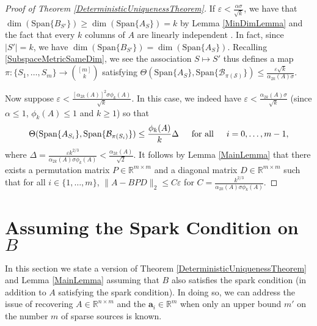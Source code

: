 \documentclass[journal, onecolumn]{IEEEtran}
\begin{document}
\begin{proof}[Proof of Theorem \ref{DeterministicUniquenessTheorem}]
If $\varepsilon < \frac{\alpha\sigma}{\sqrt{k}}$, we have that $\dim(\text{Span}\{B_{S'}\}) \geq \dim(\text{Span}\{A_S\}) = k$ by Lemma \ref{MinDimLemma} and the fact that every $k$ columns of $A$ are linearly independent . In fact, since $|S'| = k$, we have $\dim(\text{Span}\{B_{S'}\}) = \dim(\text{Span}\{A_S\})$. Recalling \eqref{SubspaceMetricSameDim},  we see the association $S \mapsto S'$ thus defines a map $\pi: \{S_1, \ldots, S_m\} \to {[m] \choose k}$ satisfying $\Theta(\text{Span}\{A_S\}, \text{Span}\{\mathcal{B_{\pi(S)}}\}) \leq \frac{ \varepsilon \sqrt{k} }{ \alpha_{2k}(A) \sigma }$.

Now suppose $\varepsilon < \frac{[\alpha_{2k}(A)]^2\sigma\phi_k(A)}{\sqrt{k}}$. In this case, we indeed have $\varepsilon < \frac{\alpha_{2k}(A)\sigma}{\sqrt{k}}$ (since $\alpha \leq 1$, $\phi_k(A) \leq 1$ and $k \geq 1$) so that 
\begin{align}\label{SubspaceDistanceUpperBound}
\Theta(\text{Span}\{A_{S_i}\}, \text{Span}\{\mathcal{B}_{\pi(S_i)}\}) \leq \frac{\phi_k(A)}{k}\Delta
\indent \text{for all} \indent i = 0, \ldots, m-1,
\end{align}
%
where $\Delta = \frac{\varepsilon k^{2/3}}{\alpha_{2k}(A)\sigma\phi_k(A)} < \frac{\alpha_{2k}(A)}{\sqrt{2}}$. It follows by Lemma \ref{MainLemma} that there exists a permutation matrix $P \in \mathbb{R}^{m \times m}$ and a diagonal matrix $D \in \mathbb{R}^{m \times m}$ such that for all $i \in \{1, \ldots, m\}$,
$\|A - BPD\|_2 \leq C\varepsilon$ for $C = \frac{k^{2/3}}{\alpha_{2k}(A)\sigma\phi_k(A)}$.
\end{proof}



\section{Assuming the Spark Condition on $B$}\label{mleqm}

In this section we state a version of Theorem \ref{DeterministicUniquenessTheorem} and Lemma \ref{MainLemma} assuming that $B$ also satisfies the spark condition (in addition to $A$ satisfying the spark condition). In doing so, we can address the issue of recovering $A \in \mathbb{R}^{n \times m}$ and the $\mathbf{a}_i \in \mathbb{R}^m$ when only an upper bound $m'$ on the number $m$ of sparse sources is known.
\end{document}
